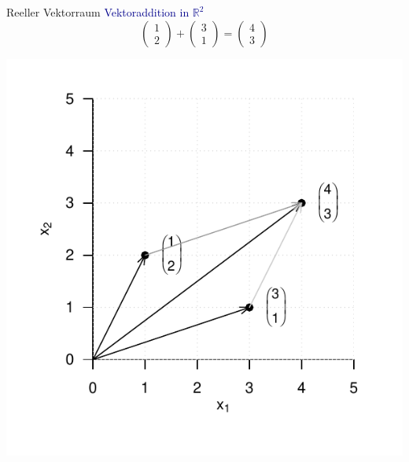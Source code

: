 \documentclass[
  8pt,
  ignorenonframetext,
]{beamer}
\begin{document}
\begin{frame}{Reeller Vektorraum}
\protect\hypertarget{reeller-vektorraum-6}{}
\textcolor{darkblue}{Vektoraddition in $\mathbb{R}^2$} \vspace{2mm}
\small \begin{equation}
\begin{pmatrix}
1 \\ 2
\end{pmatrix}
+
\begin{pmatrix}
3 \\ 1
\end{pmatrix}
=
\begin{pmatrix}
4 \\ 3
\end{pmatrix}
\end{equation} \vspace{-2mm}

\begin{center}\includegraphics[width=0.5\linewidth]{2_Abbildungen/mvda_2_vektoraddition_R2} \end{center}
\end{frame}
\end{document}
